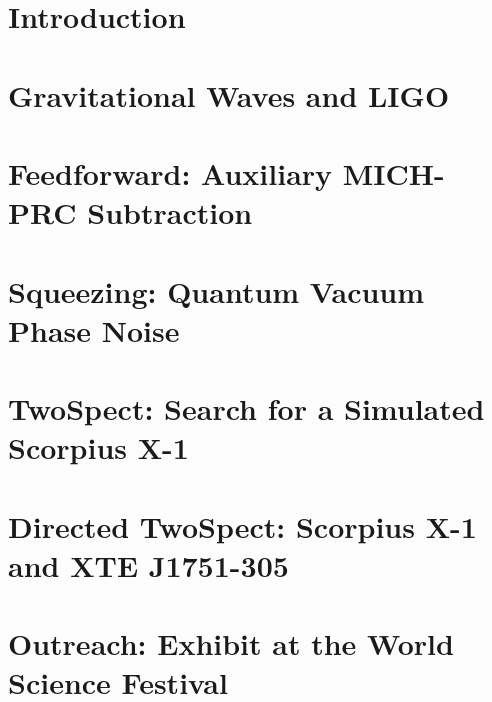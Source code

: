 \documentclass[leqno,twoside]{report}
\theoremstyle{plain}
\theoremstyle{definition}
\theoremstyle{remark}
\numberwithin{theorem}{chapter}        %
\begin{document}


\tableofcontents
\listoffigures
\listoftables
\listofappendices


\startthechapters 



\chapter{Introduction}
\label{intro} 

\chapter{Gravitational Waves and LIGO}
\label{chap2}

\chapter{Feedforward: Auxiliary MICH-PRC Subtraction}
\label{chap3}

\chapter{Squeezing: Quantum Vacuum Phase Noise}
\label{chap4}

\chapter{TwoSpect: Search for a Simulated Scorpius X-1}
\label{chap5}

\chapter{Directed TwoSpect: Scorpius X-1 and XTE J1751-305}
\label{chap6}

\chapter{Outreach: Exhibit at the World Science Festival}
\label{chap7}

\end{document}
